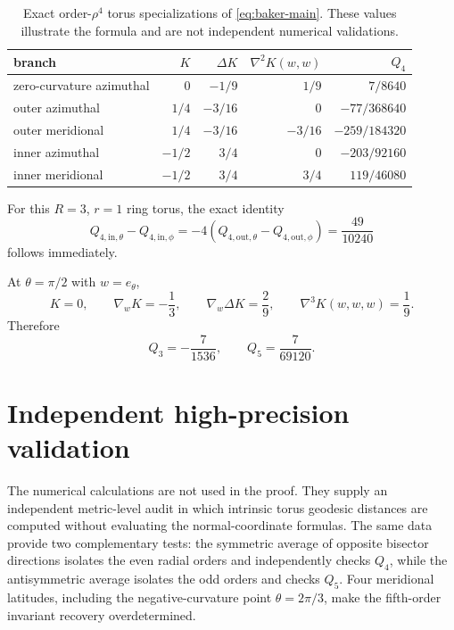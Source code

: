 \documentclass[11pt]{amsart}
\numberwithin{equation}{section}
\theoremstyle{remark}
\newcommand{\Hess}{\nabla^2}
\newcommand{\Third}{\nabla^3}
\begin{document}
\begin{table}[htbp]
\centering
\caption{Exact order-$\rho^4$ torus specializations of \eqref{eq:baker-main}.  These values illustrate the formula and are not independent numerical validations.}
\label{tab:q4anchors}
\begin{tabular}{lrrrr}
\toprule
branch & $K$ & $\Delta K$ & $\Hess K(w,w)$ & $Q_4$\\
\midrule
zero-curvature azimuthal & $0$ & $-1/9$ & $1/9$ & $7/8640$\\
outer azimuthal & $1/4$ & $-3/16$ & $0$ & $-77/368640$\\
outer meridional & $1/4$ & $-3/16$ & $-3/16$ & $-259/184320$\\
inner azimuthal & $-1/2$ & $3/4$ & $0$ & $-203/92160$\\
inner meridional & $-1/2$ & $3/4$ & $3/4$ & $119/46080$\\
\bottomrule
\end{tabular}
\end{table}
For this $R=3$, $r=1$ ring torus, the exact identity
\[
 Q_{4,\mathrm{in},\theta}-Q_{4,\mathrm{in},\phi}
 =-4\left(Q_{4,\mathrm{out},\theta}-Q_{4,\mathrm{out},\phi}\right)
 =\frac{49}{10240}
\]
follows immediately.

At $\theta=\pi/2$ with $w=e_\theta$,
\[
 K=0,\qquad \nabla_wK=-\frac13,
 \qquad \nabla_w\Delta K=\frac29,
 \qquad \Third K(w,w,w)=\frac19.
\]
Therefore
\begin{equation}\label{eq:q5anchor}
 Q_3=-\frac7{1536},
 \qquad
 Q_5=\frac7{69120}.
\end{equation}

\section{Independent high-precision validation}\label{sec:numerics}

The numerical calculations are not used in the proof.  They supply an independent metric-level audit in which intrinsic torus geodesic distances are computed without evaluating the normal-coordinate formulas.  The same data provide two complementary tests: the symmetric average of opposite bisector directions isolates the even radial orders and independently checks $Q_4$, while the antisymmetric average isolates the odd orders and checks $Q_5$.  Four meridional latitudes, including the negative-curvature point $\theta=2\pi/3$, make the fifth-order invariant recovery overdetermined.
\end{document}
